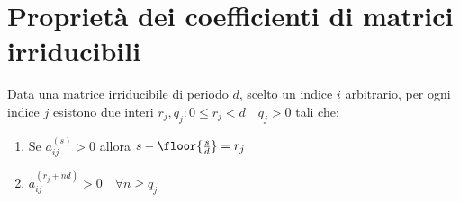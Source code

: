 \documentclass[\main/main.tex]{subfiles}
\begin{document}
\section{Proprietà dei coefficienti di matrici irriducibili}
\begin{theorem}
  Data una matrice irriducibile di periodo \(d\), scelto un indice \(i\) arbitrario, per ogni indice \(j\) esistono due interi \(r_j, q_j: 0\leq r_j < d \quad q_j > 0\) tali che:
  \begin{enumerate}
    \item Se \(a_{ij}^{(s)}>0\) allora \(s-\floor{\frac{s}{d}}=r_j\)
    \item \(a_{ij}^{(r_j + nd)}>0 \quad \forall n \geq q_j\)
  \end{enumerate}
\end{theorem}
\end{document}
